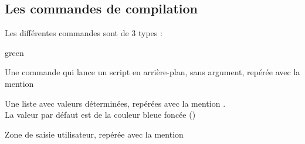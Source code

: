 \subsection{Les commandes de compilation}

Les différentes commandes sont de 3 types :

\begin{items}{green}{\faviconLeaf}
\item Une commande qui lance un script en arrière-plan, sans argument, repérée avec la mention 
\item Une liste avec valeurs déterminées, repérées avec la mention .\\La valeur par défaut est de la couleur bleue foncée ()
\item Zone de saisie utilisateur, repérée avec la mention 
\end{items}

